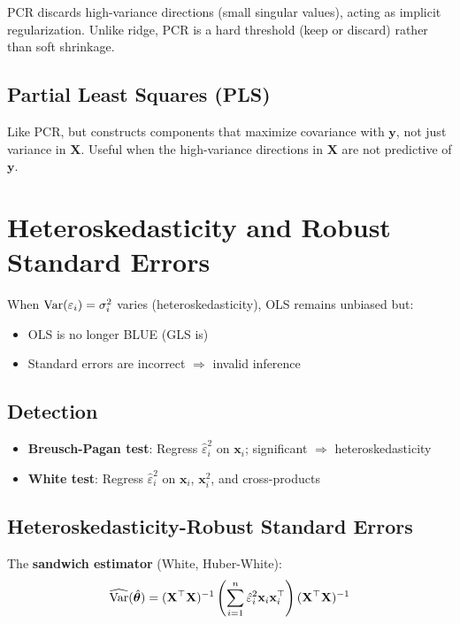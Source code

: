 \documentclass[main.tex]{subfiles}
\begin{document}
PCR discards high-variance directions (small singular values), acting as implicit regularization. Unlike ridge, PCR is a hard threshold (keep or discard) rather than soft shrinkage.

\subsection{Partial Least Squares (PLS)}

Like PCR, but constructs components that maximize covariance with $\mathbf{y}$, not just variance in $\mathbf{X}$. Useful when the high-variance directions in $\mathbf{X}$ are not predictive of $\mathbf{y}$.

\needspace{0.33\textheight}
\section{Heteroskedasticity and Robust Standard Errors}

When $\text{Var}(\varepsilon_i) = \sigma_i^2$ varies (heteroskedasticity), OLS remains unbiased but:
\begin{itemize}
    \item OLS is no longer BLUE (GLS is)
    \item Standard errors are incorrect $\Rightarrow$ invalid inference
\end{itemize}

\subsection{Detection}

\begin{itemize}
    \item \textbf{Breusch-Pagan test}: Regress $\hat{\varepsilon}_i^2$ on $\mathbf{x}_i$; significant $\Rightarrow$ heteroskedasticity
    \item \textbf{White test}: Regress $\hat{\varepsilon}_i^2$ on $\mathbf{x}_i$, $\mathbf{x}_i^2$, and cross-products
\end{itemize}

\subsection{Heteroskedasticity-Robust Standard Errors}

The \textbf{sandwich estimator} (White, Huber-White):
$$\widehat{\text{Var}}(\hat{\boldsymbol{\theta}}) = (\mathbf{X}^\top\mathbf{X})^{-1}\left(\sum_{i=1}^{n}\hat{\varepsilon}_i^2\mathbf{x}_i\mathbf{x}_i^\top\right)(\mathbf{X}^\top\mathbf{X})^{-1}$$
\end{document}
